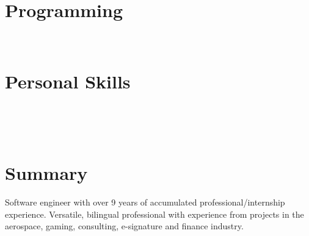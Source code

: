 \documentclass[]{friggeri-cv}
\begin{document}
\begin{aside}
  \section{Programming}
    ~
  \section{Personal Skills}
    ~
\end{aside}
~
\section{Summary}

Software engineer with over 9 years of accumulated professional/internship experience. Versatile, bilingual professional with experience from projects in the aerospace, gaming, consulting, e-signature and finance industry.
\end{document}
